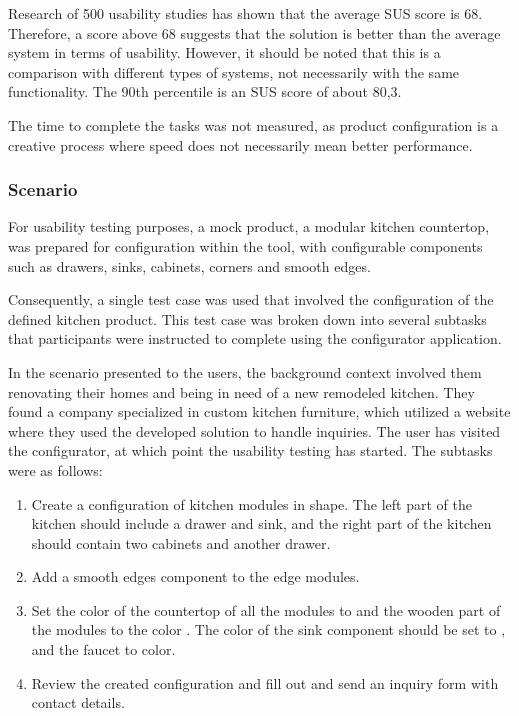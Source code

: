 Research of 500 usability studies has shown that the average SUS score is 68. Therefore, a score above 68 suggests that the solution is better than the average system in terms of usability. However, it should be noted that this is a comparison with different types of systems, not necessarily with the same functionality. The 90th percentile is an SUS score of about 80,3. \cite{Sauro2011}

The time to complete the tasks was not measured, as product configuration is a creative process where speed does not necessarily mean better performance. 

\subsubsection{Scenario}

For usability testing purposes, a mock product, a modular kitchen countertop, was prepared for configuration within the tool, with configurable components such as drawers, sinks, cabinets, corners and smooth edges.

Consequently, a single test case was used that involved the configuration of the defined kitchen product. This test case was broken down into several subtasks that participants were instructed to complete using the configurator application.

In the scenario presented to the users, the background context involved them renovating their homes and being in need of a new remodeled kitchen. They found a company specialized in custom kitchen furniture, which utilized a website where they used the developed solution to handle inquiries. The user has visited the configurator, at which point the usability testing has started. The subtasks were as follows:
\begin{enumerate}
    \item Create a configuration of kitchen modules in  shape. The left part of the kitchen should include a drawer and sink, and the right part of the kitchen should contain two cabinets and another drawer.
    \item Add a smooth edges component to the edge modules.
    \item Set the color of the countertop of all the modules to  and the wooden part of the modules to the color . The color of the sink component should be set to , and the faucet to  color.
    \item Review the created configuration and fill out and send an inquiry form with contact details.
\end{enumerate}

